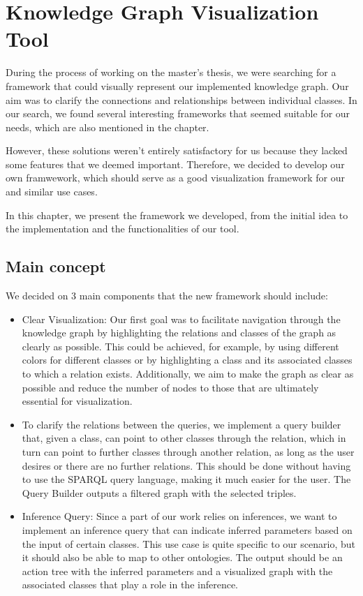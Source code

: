 \chapter{Knowledge Graph Visualization Tool}
During the process of working on the master's thesis, we were searching for a framework that could visually represent our implemented knowledge graph. Our aim was to clarify the connections and relationships between individual classes. In our search, we found several interesting frameworks that seemed suitable for our needs, which are also mentioned in the  chapter.

However, these solutions weren't entirely satisfactory for us because they lacked some features that we deemed important. Therefore, we decided to develop our own framwework, which should serve as a good visualization framework for our and similar use cases.

In this chapter, we present the framework we developed, from the initial idea to the implementation and the functionalities of our tool.

\section{Main concept}
\label{sec:MainConceps}

We decided on 3 main components that the new framework should include:
\begin{itemize}
    \item Clear Visualization: Our first goal was to facilitate navigation through the knowledge graph by highlighting the relations and classes of the graph as clearly as possible. This could be achieved, for example, by using different colors for different classes or by highlighting a class and its associated classes to which a relation exists. Additionally, we aim to make the graph as clear as possible and reduce the number of nodes to those that are ultimately essential for visualization.
    \item To clarify the relations between the queries, we implement a query builder that, given a class, can point to other classes through the relation, which in turn can point to further classes through another relation, as long as the user desires or there are no further relations. This should be done without having to use the SPARQL query language, making it much easier for the user. The Query Builder outputs a filtered graph with the selected triples.
    \item Inference Query: Since a part of our work relies on inferences, we want to implement an inference query that can indicate inferred parameters based on the input of certain classes. This use case is quite specific to our scenario, but it should also be able to map to other ontologies. The output should be an action tree with the inferred parameters and a visualized graph with the associated classes that play a role in the inference.
\end{itemize}

